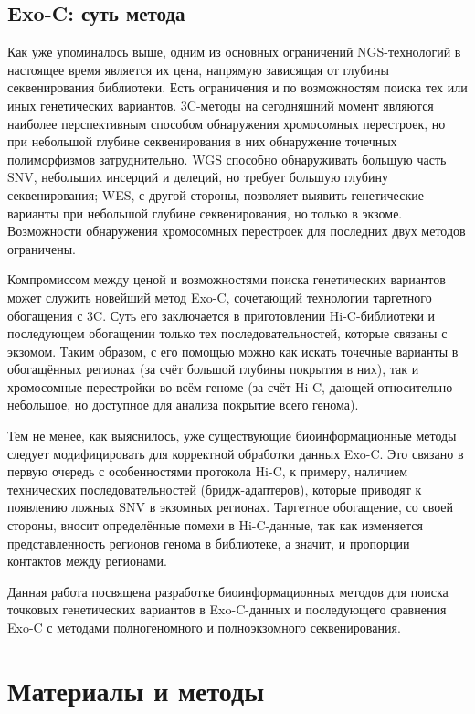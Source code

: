 \documentclass[a4paper,12pt]{article}
\begin{document}
\subsection{Exo-C: суть метода}

Как уже упоминалось выше, одним из основных ограничений NGS-технологий в настоящее время является их цена, напрямую зависящая от глубины секвенирования библиотеки.
Есть ограничения и по возможностям поиска тех или иных генетических вариантов.
3C-методы на сегодняшний момент являются наиболее перспективным способом обнаружения хромосомных перестроек\cite{Melo_2020}, но при небольшой глубине секвенирования в них обнаружение точечных полиморфизмов затруднительно\cite{Sims_2014}.
WGS способно обнаруживать большую часть SNV, небольших инсерций и делеций, но требует большую глубину секвенирования\cite{Sims_2014}; WES, с другой стороны, позволяет выявить генетические варианты при небольшой глубине секвенирования, но только в экзоме.
Возможности обнаружения хромосомных перестроек для последних двух методов ограничены.

Компромиссом между ценой и возможностями поиска генетических вариантов может служить новейший метод Exo-C, сочетающий технологии таргетного обогащения с 3C.
Суть его заключается в приготовлении Hi-C-библиотеки и последующем обогащении только тех последовательностей, которые связаны с экзомом.
Таким образом, с его помощью можно как искать точечные варианты в обогащённых регионах (за счёт большой глубины покрытия в них), так и хромосомные перестройки во всём геноме (за счёт Hi-C, дающей относительно небольшое, но доступное для анализа покрытие всего генома)\cite{Mozheiko_2019}.

Тем не менее, как выяснилось, уже существующие биоинформационные методы следует модифицировать для корректной обработки данных Exo-C.
Это связано в первую очередь с особенностями протокола Hi-C, к примеру, наличием технических последовательностей (бридж-адаптеров), которые приводят к появлению ложных SNV в экзомных регионах.
Таргетное обогащение, со своей стороны, вносит определённые помехи в Hi-C-данные, так как изменяется представленность регионов генома в библиотеке, а значит, и пропорции контактов между регионами.

Данная работа посвящена разработке биоинформационных методов для поиска точковых генетических вариантов в Exo-C-данных и последующего сравнения Exo-C с методами полногеномного и полноэкзомного секвенирования.

\section{Материалы и методы}
\end{document}
